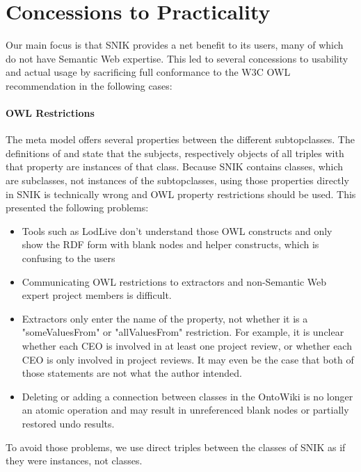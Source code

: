 \documentclass[sw]{iosart2x}
\begin{document}
\section{Concessions to Practicality}
Our main focus is that SNIK provides a net benefit to its users, many of which do not have Semantic Web expertise.
This led to several concessions to usability and actual usage by sacrificing full conformance to the W3C OWL recommendation in the following cases:

\paragraph{OWL Restrictions}
The meta model offers several properties between the different subtopclasses.
The definitions of  and  state that the subjects, respectively objects of all triples with that property are instances of that class.
Because SNIK contains classes, which are subclasses, not instances of the subtopclasses, using those properties directly in SNIK is technically wrong and OWL property restrictions should be used.
This presented the following problems:
\begin{itemize}
\item Tools such as LodLive don't understand those OWL constructs and only show the RDF form with blank nodes and helper constructs, which is confusing to the users
\item Communicating OWL restrictions to extractors and non-Semantic Web expert project members is difficult.
\item Extractors only enter the name of the property, not whether it is a "someValuesFrom" or "allValuesFrom" restriction.
For example, it is unclear whether each CEO is involved in at least one project review, or whether each CEO is only involved in project reviews.
It may even be the case that both of those statements are not what the author intended.
\item Deleting or adding a connection between classes in the OntoWiki is no longer an atomic operation and may result in unreferenced blank nodes or partially restored undo results.
\end{itemize}

To avoid those problems, we use direct triples between the classes of SNIK as if they were instances, not classes.

\paragraph{}
\end{document}
